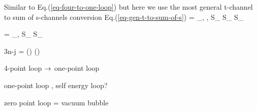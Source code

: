 Similar to Eq.(\ref{eq-four-to-one-loop})
but here we use the most general 
t-channel to sum of s-channels conversion Eq.(\ref{eq-gen-t-to-sum-of-s})
\beq
\bcen
{}
\ecen
=
\sum_{\lam, \mu, \nu}
{S_\lam}
{S_\mu}
{S_\nu}
\bcen
{}
\ecen
\eeq

\beq
\bcen
{}
\ecen
=
\sum_{\lam, \mu}
{S_\lam}
{S_\mu}
\bcen
{}
\ecen
\eeq

\beq
3n-j 
=
\sum ()
()
\eeq

4-point loop $\rightarrow$ one-point loop

one-point loop , self energy loop?

zero point loop =  vacuum bubble